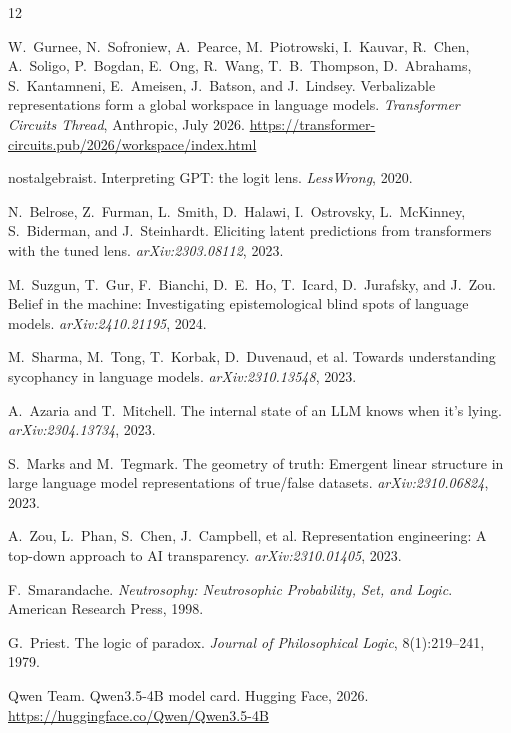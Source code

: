 \documentclass[11pt]{article}
\begin{document}
\begin{thebibliography}{12}

W.~Gurnee, N.~Sofroniew, A.~Pearce, M.~Piotrowski, I.~Kauvar, R.~Chen,
A.~Soligo, P.~Bogdan, E.~Ong, R.~Wang, T.~B.~Thompson, D.~Abrahams,
S.~Kantamneni, E.~Ameisen, J.~Batson, and J.~Lindsey.
\newblock Verbalizable representations form a global workspace in language
models.
\newblock \emph{Transformer Circuits Thread}, Anthropic, July 2026.
\newblock \url{https://transformer-circuits.pub/2026/workspace/index.html}

nostalgebraist.
\newblock Interpreting GPT: the logit lens.
\newblock \emph{LessWrong}, 2020.

N.~Belrose, Z.~Furman, L.~Smith, D.~Halawi, I.~Ostrovsky, L.~McKinney,
S.~Biderman, and J.~Steinhardt.
\newblock Eliciting latent predictions from transformers with the tuned lens.
\newblock \emph{arXiv:2303.08112}, 2023.

M.~Suzgun, T.~Gur, F.~Bianchi, D.~E.~Ho, T.~Icard, D.~Jurafsky, and J.~Zou.
\newblock Belief in the machine: Investigating epistemological blind spots of
language models.
\newblock \emph{arXiv:2410.21195}, 2024.

M.~Sharma, M.~Tong, T.~Korbak, D.~Duvenaud, et al.
\newblock Towards understanding sycophancy in language models.
\newblock \emph{arXiv:2310.13548}, 2023.

A.~Azaria and T.~Mitchell.
\newblock The internal state of an LLM knows when it's lying.
\newblock \emph{arXiv:2304.13734}, 2023.

S.~Marks and M.~Tegmark.
\newblock The geometry of truth: Emergent linear structure in large language
model representations of true/false datasets.
\newblock \emph{arXiv:2310.06824}, 2023.

A.~Zou, L.~Phan, S.~Chen, J.~Campbell, et al.
\newblock Representation engineering: A top-down approach to AI transparency.
\newblock \emph{arXiv:2310.01405}, 2023.

F.~Smarandache.
\newblock \emph{Neutrosophy: Neutrosophic Probability, Set, and Logic}.
\newblock American Research Press, 1998.

G.~Priest.
\newblock The logic of paradox.
\newblock \emph{Journal of Philosophical Logic}, 8(1):219--241, 1979.

Qwen Team.
\newblock Qwen3.5-4B model card.
\newblock Hugging Face, 2026.
\newblock \url{https://huggingface.co/Qwen/Qwen3.5-4B}

\end{thebibliography}
\end{document}

